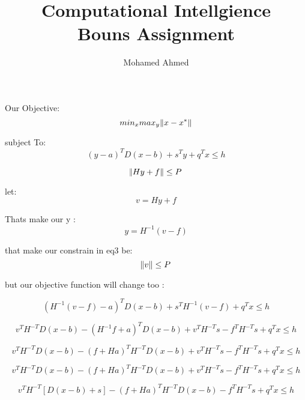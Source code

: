 \documentclass{article}
\title{Computational Intellgience \\Bouns Assignment}
\author{Mohamed Ahmed}
\begin{document}
\maketitle

Our Objective:
\begin{equation}
min_{x} max_{y} \norm{x-x^*}
\end{equation}


subject To:
\begin{equation}
(y-a)^T D (x-b) + s^T y+ q^T x \leq h 
\end{equation}

\begin{equation}
    \norm{Hy+f}\leq P
\end{equation}

let: 
\begin{equation}
    v=Hy+f
\end{equation}

Thats make our y :
\begin{equation}
    y=H^{-1} (v-f)
\end{equation}

that make our constrain in eq3 be: 
\begin{equation}
    \norm{v}\leq P
\end{equation}

but our objective function will change too :


\begin{equation}
(H^{-1}(v-f)-a)^T D (x-b) + s^T H^{-1} (v-f)+ q^T x \leq h
\end{equation}


\begin{equation}
v^T H^{-T} D (x-b)-(H^{-1}f+a)^T D (x-b) + v^T H^{-T} s - f^T H^{-T} s+ q^T x \leq h
\end{equation}


\begin{equation}
v^T H^{-T} D (x-b)-(f+H a)^T H^{-T} D (x-b) + v^T H^{-T} s - f^T H^{-T} s+ q^T x \leq h
\end{equation}


\begin{equation}
v^T H^{-T} D (x-b)-(f+H a)^T H^{-T} D (x-b) + v^T H^{-T} s - f^T H^{-T} s+ q^T x \leq h
\end{equation}

\begin{equation}
v^T H^{-T} [D (x-b)+s ]-(f+H a)^T H^{-T} D (x-b) - f^T H^{-T} s+ q^T x \leq h
\end{equation}
\end{document}
